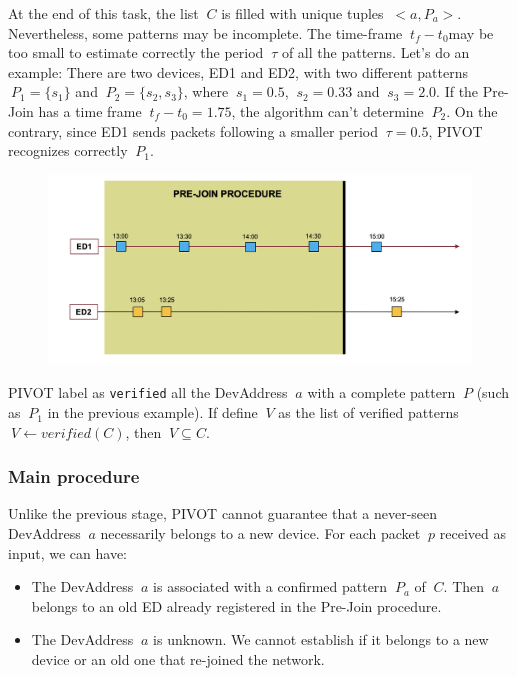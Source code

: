 At the end of this task, the list \(\ C \) is filled with unique tuples \(\ <a, P_{a}> \). Nevertheless, some patterns may be incomplete. The time-frame \(\ t_{f} - t_{0} \)may be too small to estimate correctly the period \(\ \tau\) of all the patterns. Let's do an example:
There are two devices, ED1 and ED2, with two different patterns \(\ P_{1} = \{ s_{1} \} \) and \(\ P_{2} = \{ s_{2}, s_{3} \} \), where \(\ s_{1} = 0.5 \), \(\ s_{2} = 0.33 \) and \(\ s_{3} = 2.0 \). If the Pre-Join has a time frame \(\ t_{f} - t_{0} = 1.75 \), the algorithm can't determine \(\ P_{2} \). On the contrary, since ED1 sends packets following a smaller period \(\ \tau = 0.5\), PIVOT recognizes correctly \(\ P_{1} \).
\begin{figure}
    \centering
    \includegraphics[width=0.7\linewidth]{images/pivot/missing_pattern.png}
    \caption{}
\end{figure}

PIVOT label as \texttt{verified} all the DevAddress \(\ a \) with a complete pattern \(\ P \) (such as \(\ P_{1} \) in the previous example). If define \(\ V \) as the list of verified patterns \(\ V \gets verified(C) \), then \(\ V \subseteq C\).

\subsubsection{Main procedure}
Unlike the previous stage, PIVOT cannot guarantee that a never-seen DevAddress \(\ a \) necessarily belongs to a new device. For each packet \(\ p \) received as input, we can have:
\begin{itemize}
	\item The DevAddress \(\ a \) is associated with a confirmed pattern \(\ P_{a} \) of \(\ C \). Then \(\ a \) belongs to an old ED already registered in the Pre-Join procedure.
	\item The DevAddress \(\ a \) is unknown. We cannot establish if it belongs to a new device or an old one that re-joined the network.
\end{itemize}

